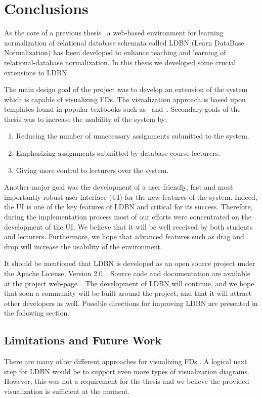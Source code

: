 \chapter{Conclusions}
\label{chap:conclusion}
As the core of a previous thesis~\cite{mt1}
a web-based environment for learning normalization of relational database schemata
called LDBN (Learn DataBase Normalization) has been developed to
enhance teaching and learning of relational-database normalization. 
In this thesis we developed some crucial extensions to LDBN.

The main design goal of the project was to develop an extension of the system which is capable of 
visualizing FDs. The visualization approach is based
upon templates found in popular textbooks such as~\cite{bdb1} and~\cite{bdb2}. Secondary goals of the
thesis was to increase the usability of the system by: 

\begin{enumerate}
	\item Reducing the number of unnecessary assignments
	submitted to the system.
	\item Emphasizing assignments submitted by database course lecturers.
	\item Giving more control to lecturers over the system.
\end{enumerate}

Another major goal was the
development of a user friendly, fast and most importantly robust
user interface (UI) for the new features of the system. 
Indeed, the UI is one of the key features of LDBN and critical for its
success. Therefore, during the implementation process 
most of our efforts were concentrated on the development of the UI. We believe that it will be well received 
by both students and lecturers.
Furthermore, we hope that advanced features such as drag and drop will 
increase the usability of the environment.

It should be mentioned that LDBN is developed as an open source project 
under the Apache License, Version 2.0~\cite{walv20}. 
Source code and documentation are available at the project web-page~\cite{wldbnpp}. 
The development of LDBN will continue, and we
hope that soon a community will be
built around the project, and that it will attract other developers as well. Possible directions for 
improving LDBN are presented in the following section. 

\section{Limitations and Future Work}
There are many other different approaches for visualizing FDs .
A logical next step for LDBN would be to support
even more types of visualization diagrams. 
However, this was not a requirement for the thesis and we believe the provided 
visualization is sufficient at the moment. 

